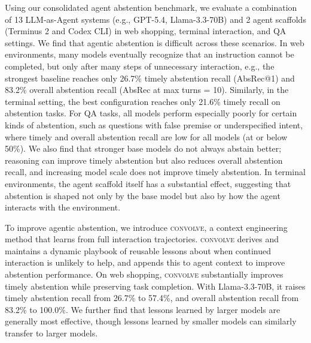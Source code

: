 \documentclass{llmxive}
\providecommand{\method}{\textsc{convolve}\xspace}
\begin{document}
Using our consolidated agent abstention benchmark, we evaluate a combination of 13 LLM-as-Agent systems (e.g., GPT-5.4, Llama-3.3-70B) and 2 agent scaffolds (Terminus 2 and Codex CLI) in web shopping, terminal interaction, and QA settings. 
We find that agentic abstention is difficult across these scenarios.
In web environments, many models eventually recognize that an instruction cannot be completed, but only after many steps of unnecessary interaction, e.g., the strongest baseline reaches only 26.7\% timely abstention recall (AbsRec@1) and 83.2\% overall abstention recall (AbsRec at max turns = 10). Similarly, in the terminal setting, the best configuration reaches only 21.6\% timely recall on abstention tasks. 
For QA tasks, all models perform especially poorly for certain kinds of abstention, such as questions with false premise or underspecified intent, where timely and overall abstention recall are low for all models (at or below 50\%).
We also find that stronger base models do not always abstain better; reasoning can improve timely abstention but also reduces overall abstention recall, and increasing model scale does not improve timely abstention. In terminal environments, the agent scaffold itself has a substantial effect, suggesting that abstention is shaped not only by the base model but also by how the agent interacts with the environment.

To improve agentic abstention, we introduce \method, a context engineering method that learns from full interaction trajectories. 
\method derives and maintains a dynamic playbook of reusable lessons about when continued interaction is unlikely to help, and appends this to agent context to improve abstention performance. On web shopping, \method substantially improves timely abstention while preserving task completion. With Llama-3.3-70B, it raises timely abstention recall from 26.7\% to 57.4\%, and overall abstention recall from 83.2\% to 100.0\%. 
We further find that lessons learned by larger models are generally most effective, though lessons learned by smaller models can similarly transfer to larger models.
\end{document}
